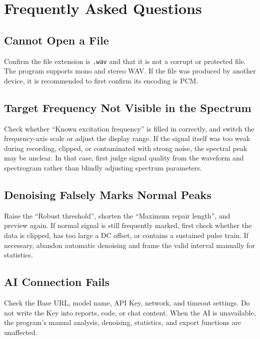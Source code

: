 \documentclass[UTF8,a4paper,12pt]{ctexart}
\begin{document}
\section{Frequently Asked Questions}

\subsection{Cannot Open a File}

Confirm the file extension is \texttt{.wav} and that it is not a corrupt or protected file. The program supports mono and stereo WAV. If the file was produced by another device, it is recommended to first confirm its encoding is PCM.

\subsection{Target Frequency Not Visible in the Spectrum}

Check whether ``Known excitation frequency'' is filled in correctly, and switch the frequency-axis scale or adjust the display range. If the signal itself was too weak during recording, clipped, or contaminated with strong noise, the spectral peak may be unclear. In that case, first judge signal quality from the waveform and spectrogram rather than blindly adjusting spectrum parameters.

\subsection{Denoising Falsely Marks Normal Peaks}

Raise the ``Robust threshold'', shorten the ``Maximum repair length'', and preview again. If normal signal is still frequently marked, first check whether the data is clipped, has too large a DC offset, or contains a sustained pulse train. If necessary, abandon automatic denoising and frame the valid interval manually for statistics.

\subsection{AI Connection Fails}

Check the Base URL, model name, API Key, network, and timeout settings. Do not write the Key into reports, code, or chat content. When the AI is unavailable, the program's manual analysis, denoising, statistics, and export functions are unaffected.

\end{document}
